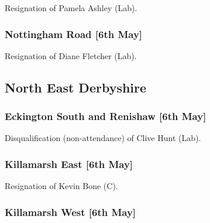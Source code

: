 \documentclass[a4paper,openany]{book}
\begin{document}
\begin{resultsiii}

Resignation of Pamela Ashley (Lab).

\subsubsection*{Nottingham Road \hspace*{\fill}\nolinebreak[1]%
	\enspace\hspace*{\fill}
	[6th May]}


Resignation of Diane Fletcher (Lab).

\subsection*{North East Derbyshire}

\subsubsection*{Eckington South and Renishaw \hspace*{\fill}\nolinebreak[1]%
	\enspace\hspace*{\fill}
	[6th May]}


Disqualification (non-attendance) of Clive Hunt (Lab).

\subsubsection*{Killamarsh East \hspace*{\fill}\nolinebreak[1]%
	\enspace\hspace*{\fill}
	[6th May]}


Resignation of Kevin Bone (C).

\subsubsection*{Killamarsh West \hspace*{\fill}\nolinebreak[1]%
	\enspace\hspace*{\fill}
	[6th May]}


\end{resultsiii}
\end{document}
